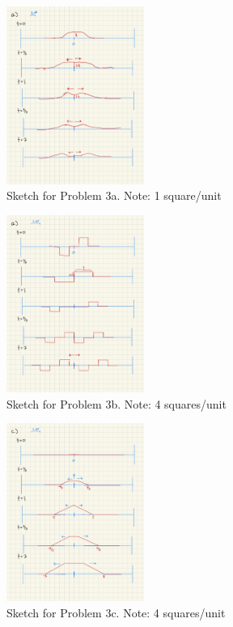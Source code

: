 \documentclass{article}
\begin{document}
\clearpage \noindent
\begin{figure}
    \centering
    \includegraphics[width=0.4\textwidth]{HW_4_Plots-a.jpg}
    \caption{Sketch for Problem 3a. Note: 1 square/unit}
    \label{fig:sample}
\end{figure}
\begin{figure}
    \centering
    \includegraphics[width=0.4\textwidth]{HW_4_Plots-b.jpg}
    \caption{Sketch for Problem 3b. Note: 4 squares/unit}
    \label{fig:sample}
\end{figure}
\begin{figure}
    \centering
    \includegraphics[width=0.4\textwidth]{HW_4_Plots-c.jpg}
    \caption{Sketch for Problem 3c. Note: 4 squares/unit}
    \label{fig:sample}
\end{figure}
\end{document}
